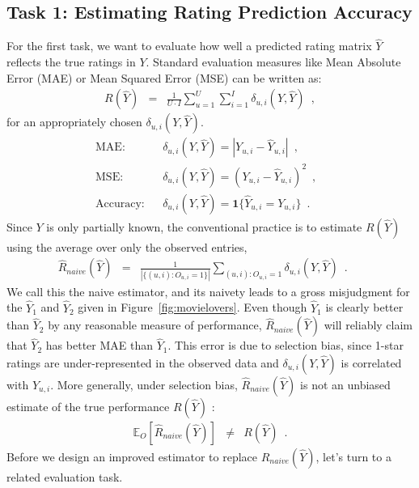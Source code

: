 \documentclass{article}
\def\E{{\mathbb{E}}}
\newcommand{\user}{u}                       %
\newcommand{\users}{U}                      %
\newcommand{\movie}{i}                      %
\newcommand{\movies}{I}                     %
\newcommand{\ytrue}{Y}                      %
\newcommand{\ytrueelem}[1]{\ytrue_{#1}}
\newcommand{\ytrueum}{\ytrueelem{\user,\movie}}
\newcommand{\ypred}{\hat{Y}}                %
\newcommand{\ypredelem}[1]{\ypred_{#1}}
\newcommand{\ypredum}{\ypredelem{\user,\movie}}
\newcommand{\loss}[3]{\delta_{#1}(#2,#3)}   %
\newcommand{\lossum}{\loss{\user,\movie}{\ytrue}{\ypred}}
\newcommand{\obs}{O}                        %
\newcommand{\obselem}[1]{\obs_{#1}}
\newcommand{\obsum}{\obselem{\user,\movie}}
\newcommand{\risk}[1]{R(#1)}                %
\newcommand{\risky}{\risk{\ypred}}
\newcommand{\naiveest}[1]{\hat{R}_{naive}(#1)}     %
\newcommand{\naiveesty}{\naiveest{\ypred}}
\begin{document}
\subsection{Task 1: Estimating Rating Prediction Accuracy}
For the first task, we want to evaluate how well a predicted rating matrix $\ypred$ reflects the true ratings in $\ytrue$. Standard evaluation measures like Mean Absolute Error (MAE) or Mean Squared Error (MSE) can be written as: 
\begin{eqnarray}
    \risky & = & \frac{1}{\users \!\cdot\! \movies}\sum_{\user=1}^{\users} \sum_{\movie=1}^{\movies} \lossum \enspace , \label{eq:risk} 
\end{eqnarray}
for an appropriately chosen $\lossum$. \vspace{-0.5em}
\begin{eqnarray}
    \mbox{MAE:} && \lossum=|\ytrueum - \ypredum|  \enspace , \label{eq:mae_loss}\\
    \mbox{MSE:} && \lossum=(\ytrueum - \ypredum)^2  \enspace , \label{eq:mse_loss}\\
    \mbox{Accuracy:} && \lossum=\mathbf{1}\{ \ypredum \!=\! \ytrueum\} \enspace .\:\:\:\:\:\:
\end{eqnarray}
Since $\ytrue$ is only partially known, the conventional practice is to estimate $\risky$ using the average over only the observed entries, 
\begin{eqnarray}
    \naiveesty & \!\!\!=\!\!\! & \frac{1}{|\{\!(\user,\movie)\!:\!\obsum \!=\! 1\!\}|}\!\sum_{(\user,\movie):\obsum=1} \!\!\!\!\!\!\!\!\!\lossum \label{eq:naiveest}\enspace .\:\:\:\:\:\:
\end{eqnarray}
We call this the naive estimator, and its naivety leads to a gross misjudgment for the $\ypred_1$ and $\ypred_2$ given in Figure~\ref{fig:movielovers}. Even though $\ypred_1$ is clearly better than $\ypred_2$ by any reasonable measure of performance, $\naiveesty$ will reliably claim that $\ypred_2$ has better MAE than $\ypred_1$. This error is due to selection bias, since 1-star ratings are under-represented in the observed data and $\lossum$ is correlated with $\ytrueum$. More generally, under selection bias, $\naiveesty$ is not an unbiased estimate of the true performance $\risky$ \cite{Steck/13}:
\begin{eqnarray}
    \E_\obs\left[\naiveesty\right] & \not= & \risky \enspace .
\end{eqnarray}
Before we %
design an improved estimator to replace $\naiveesty$, let's turn to a related evaluation task.
\end{document}
